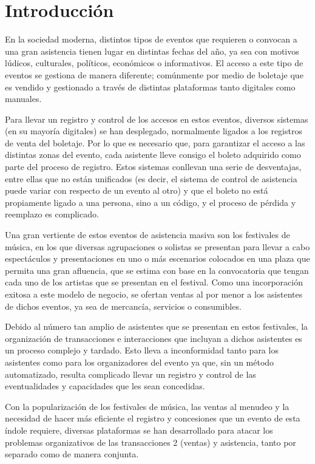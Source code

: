 \setcounter{page}{10}
\section{Introducción}

En la sociedad moderna, distintos tipos de eventos que requieren o convocan a una gran asistencia tienen lugar en distintas fechas del año, ya sea con motivos lúdicos, culturales, políticos, económicos o informativos. El acceso a este tipo de eventos se gestiona de manera diferente; comúnmente por medio de boletaje que es vendido y gestionado a través de distintas plataformas tanto digitales como manuales.

Para llevar un registro y control de los accesos en estos eventos, diversos sistemas (en su mayoría digitales) se han desplegado, normalmente ligados a los registros de venta del boletaje. Por lo que es necesario que, para garantizar el acceso a las distintas zonas del evento, cada asistente lleve consigo el boleto adquirido como parte del proceso de registro. Estos sistemas conllevan una serie de desventajas, entre ellas que no están unificados (es decir, el sistema de control de asistencia puede variar con respecto de un evento al otro) y que el boleto no está propiamente ligado a una persona, sino a un código, y el proceso de pérdida y reemplazo es complicado.

Una gran vertiente de estos eventos de asistencia masiva son los festivales de música, en los que diversas agrupaciones o solistas se presentan para llevar a cabo espectáculos y presentaciones en uno o más escenarios colocados en una plaza que permita una gran afluencia, que se estima con base en la convocatoria que tengan cada uno de los artistas que se presentan en el festival. Como una incorporación exitosa a este modelo de negocio, se ofertan ventas al por menor a los asistentes de dichos eventos, ya sea de mercancía, servicios o consumibles.

Debido al número tan amplio de asistentes que se presentan en estos festivales, la organización de transacciones e interacciones que incluyan a dichos asistentes es un proceso complejo y tardado. Esto lleva a inconformidad tanto para los asistentes como para los organizadores del evento ya que, sin un método automatizado, resulta complicado llevar un registro y control de las eventualidades y capacidades que les sean concedidas.

Con la popularización de los festivales de música, las ventas al menudeo y la necesidad de hacer más eficiente el registro y concesiones que un evento de esta índole requiere, diversas plataformas se han desarrollado para atacar los problemas organizativos de las transacciones
2 (ventas) y asistencia, tanto por separado como de manera conjunta.
